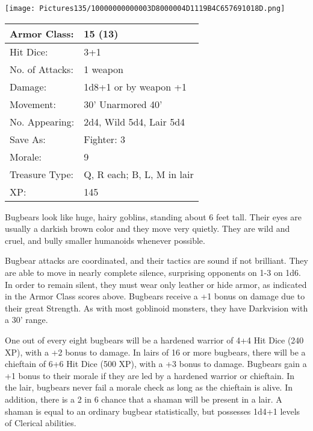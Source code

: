 \documentclass[a4paper,twoside,openany,10pt]{book}
\begin{document}
\begin{multicols}{2}
\begin{center}
\texttt{[image: Pictures135/10000000000003D8000004D1119B4C657691018D.png]}\medskip
\end{center}

\begin{center}
	\begin{tabularx}{0.48\textwidth}{@{}lX@{}}
Armor Class: & 15 (13) \\\hline
Hit Dice: & 3+1 \\\hline
No. of Attacks: & 1 weapon \\\hline
Damage: & 1d8+1 or by weapon +1 \\\hline
Movement: & 30' Unarmored 40' \\\hline
No. Appearing: & 2d4, Wild 5d4, Lair 5d4 \\\hline
Save As: & Fighter: 3 \\\hline
Morale: & 9 \\\hline
Treasure Type: & Q, R each; B, L, M in lair \\\hline
XP: & 145 \\\hline
\end{tabularx}\medskip
\end{center}

Bugbears look like huge, hairy goblins, standing about 6 feet tall. Their eyes are usually a darkish brown color and they move very quietly. They are wild and cruel, and bully smaller humanoids whenever possible. 

Bugbear attacks are coordinated, and their tactics are sound if not brilliant. They are able to move in nearly complete silence, surprising opponents on 1-3 on 1d6. In order to remain silent, they must wear only leather or hide armor, as indicated in the Armor Class scores above. Bugbears receive a +1 bonus on damage due to their great Strength. As with most goblinoid monsters, they have Darkvision with a 30' range.

One out of every eight bugbears will be a hardened warrior of 4+4 Hit Dice (240 XP), with a +2 bonus to damage. In lairs of 16 or more bugbears, there will be a chieftain of 6+6 Hit Dice (500 XP), with a +3 bonus to damage. Bugbears gain a +1 bonus to their morale if they are led by a hardened warrior or chieftain. In the lair, bugbears never fail a morale check as long as the chieftain is alive. In addition, there is a 2 in 6 chance that a shaman will be present in a lair. A shaman is equal to an ordinary bugbear statistically, but possesses 1d4+1 levels of Clerical abilities.\medskip




\end{multicols}
\end{document}

